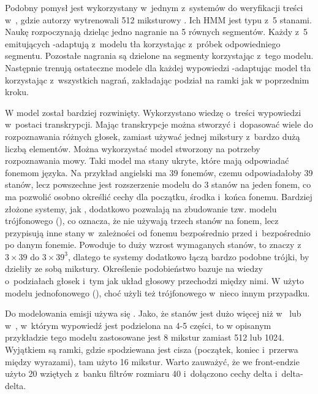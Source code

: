 Podobny pomysł jest wykorzystany w~jednym z~systemów do weryfikacji treści w~\cite{utteranceVerificationFor}, gdzie
autorzy wytrenowali 512 miksturowy . Ich HMM jest typu  z~5 stanami.
Naukę rozpoczynają dzieląc jedno nagranie na 5 równych segmentów.
Każdy z~5  emitujących -adaptują z~modelu tła korzystając z~próbek odpowiedniego segmentu.
Pozostałe nagrania są dzielone na segmenty korzystając z~tego modelu. Następnie trenują ostateczne modele dla każdej
wypowiedzi -adaptując model tła korzystając z~wszystkich nagrań, zakładając podział na ramki jak
w poprzednim kroku.

W \cite{comparisonOfMultiple}
model  został bardziej rozwinięty. Wykorzystano wiedzę o~treści wypowiedzi w~postaci transkrypcji.
Mając transkrypcje można stworzyć i~dopasować wiele  do rozpoznawania różnych głosek, zamiast
używać jednej mikstury z~bardzo dużą liczbą elementów. Można wykorzystać model stworzony na potrzeby rozpoznawania mowy.
Taki model ma stany ukryte, które mają odpowiadać fonemom języka. Na przykład angielski ma 39
fonemów, czemu odpowiadałoby 39 stanów, lecz powszechne jest rozszerzenie
modelu do 3 stanów na jeden fonem, co ma pozwolić osobno określić cechy dla początku, środka i~końca fonemu.
Bardziej złożone systemy, jak \cite{theHtkBook}
, dodatkowo pozwalają na zbudowanie tzw. modelu trójfonowego (), co oznacza,
że nie używają trzech stanów na fonem, lecz
przypisują inne stany w~zależności od fonemu bezpośrednio przed i~bezpośrednio po danym fonemie.
Powoduje to duży wzrost wymaganych stanów, to znaczy z~$3 \times 39$ do $3 \times 39^3$,
dlatego te systemy dodatkowo łączą bardzo podobne trójki, by dzieliły ze sobą mikstury.
Określenie podobieństwo bazuje na wiedzy o~podziałach głosek i~tym jak układ głosowy przechodzi między nimi.
W \cite{comparisonOfMultiple}
użyto modelu jednofonowego (), choć użyli też trójfonowego w~nieco innym przypadku.

Do modelowania emisji używa się . Jako, że stanów jest dużo więcej niż w~
lub w~, w~którym wypowiedź jest podzielona na 4-5 części, to
w opisanym przykładzie tego modelu zastosowane jest 8 mikstur zamiast 512 lub 1024. Wyjątkiem są ramki,
gdzie spodziewana jest cisza (początek, koniec i~przerwa między wyrazami), tam
użyto 16 mikstur. Warto zauważyć, że we front-endzie użyto 20  wziętych z~banku filtrów rozmiaru
40 i~dołączono cechy delta i~delta-delta.

